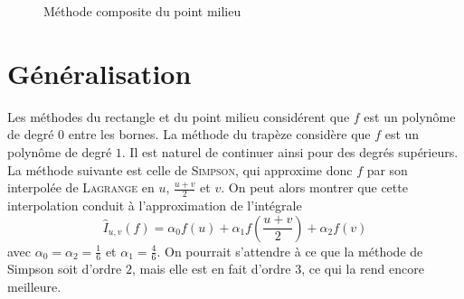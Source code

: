 \begin{figure}[h!]
    \centering

    \caption{Méthode composite du point milieu}
    \label{fig:point-milieu-composite-method}
\end{figure}


\section{Généralisation}

Les méthodes du rectangle et du point milieu considérent que $ f $ est un polynôme de degré $ 0 $ entre les bornes. La méthode du trapèze considère que $ f $ est un polynôme de degré $ 1 $. Il est naturel de continuer ainsi pour des degrés supérieurs. La méthode suivante est celle de \textsc{Simpson}, qui approxime donc $ f $ par son interpolée de \textsc{Lagrange} en $ u $, $ \frac{u+v}{2} $ et $ v $. On peut alors montrer que cette interpolation conduit à l'approximation de l'intégrale \[
    \hat{I}_{u, v}(f) = \alpha_0 f(u) + \alpha_1 f(\frac{u+v}{2}) + \alpha_2 f(v)
\]
avec $ \alpha_0=\alpha_2=\frac{1}{6} $ et $ \alpha_1=\frac{4}{6} $. On pourrait s'attendre à ce que la méthode de Simpson soit d'ordre $ 2 $, mais elle est en fait d'ordre $ 3 $, ce qui la rend encore meilleure.

